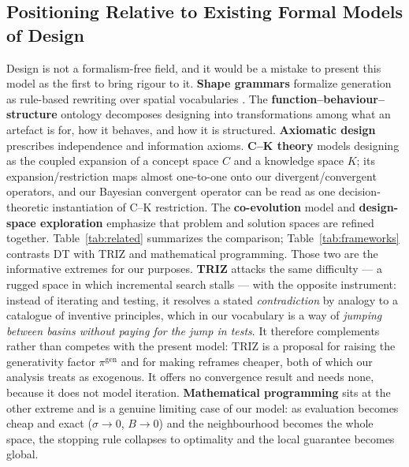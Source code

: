 \documentclass[11pt]{article}
\begin{document}
\subsection{Positioning Relative to Existing Formal Models of Design}
\label{sec:related}

Design is not a formalism-free field, and it would be a mistake to present this model as the first to bring rigour to it. \textbf{Shape grammars} formalize generation as rule-based rewriting over spatial vocabularies \citep{stiny1972}. The \textbf{function--behaviour--structure} ontology \citep{gero2004} decomposes designing into transformations among what an artefact is for, how it behaves, and how it is structured. \textbf{Axiomatic design} \citep{suh1990} prescribes independence and information axioms. \textbf{C--K theory} \citep{hatchuel2009} models designing as the coupled expansion of a concept space $C$ and a knowledge space $K$; its expansion/restriction maps almost one-to-one onto our divergent/convergent operators, and our Bayesian convergent operator can be read as one decision-theoretic instantiation of C--K restriction. The \textbf{co-evolution} model \citep{dorstcross2001, dorst1995} and \textbf{design-space exploration} \citep{woodbury2006} emphasize that problem and solution spaces are refined together. Table~\ref{tab:related} summarizes the comparison; Table~\ref{tab:frameworks} contrasts DT with TRIZ and mathematical programming. Those two are the informative extremes for our purposes. \textbf{TRIZ} \citep{altshuller1999} attacks the same difficulty --- a rugged space in which incremental search stalls --- with the opposite instrument: instead of iterating and testing, it resolves a stated \emph{contradiction} by analogy to a catalogue of inventive principles, which in our vocabulary is a way of \emph{jumping between basins without paying for the jump in tests}. It therefore complements rather than competes with the present model: TRIZ is a proposal for raising the generativity factor $\pi^{\text{gen}}$ and for making reframes cheaper, both of which our analysis treats as exogenous. It offers no convergence result and needs none, because it does not model iteration. \textbf{Mathematical programming} sits at the other extreme and is a genuine limiting case of our model: as evaluation becomes cheap and exact ($\sigma\to0$, $B\to0$) and the neighbourhood becomes the whole space, the stopping rule collapses to optimality and the local guarantee becomes global.
\end{document}
